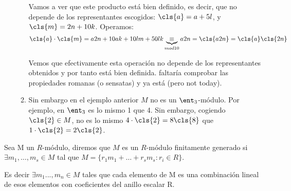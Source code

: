 \begin{example}
\begin{itemize}
\begin{enumerate}
		Vamos a ver que este producto está bien definido, es decir, que no depende de los representantes escogidos: $\cls{a}=a+5l$, y $\cls{m}=2n+10k$. Operamos:
		$$\cls{a}\cdot \cls{m}=a2n+10ak+10lm+50lk \underbrace{\equiv}_{mod 10} a2n=\cls{a2n}=\cls{a}\cls{2n}$$
		
		Vemos que efectivamente esta operación no depende de los representantes obtenidos y por tanto está bien definida. faltaría comprobar las propiedades romanas (o sensatas) y ya está (pero not today).
		\item Sin embargo en el ejemplo anterior $M$ no es un $\ent_3$-módulo. Por ejemplo, en $\ent_3$ es lo mismo 1 que 4. Sin embargo, cogiendo $\cls{2}\in M$, no es lo mismo $4\cdot\cls{2}=8\cls{8}$ que $1\cdot\cls{2}=2\cls{2}$.
	\end{enumerate}
	\end{itemize}
\end{example}

\begin{defn}
	Sea M un $R$-módulo, diremos que $M$ es un $R$-módulo finitamente generado si $\exists m_1,\dots,m_s \in M$ tal que $M=\{r_1m_1+\dots+r_sm_s: r_i \in R \}$.
	
	Es decir $\exists m_1..., m_n \in M$ tales que cada elemento de M es una combinación lineal de esos elementos con coeficientes del anillo escalar R.
\end{defn}

